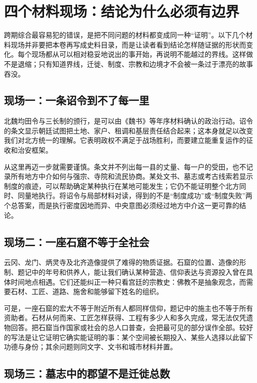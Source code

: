 \section{四个材料现场：结论为什么必须有边界}
\label{sec:synthesis-source-casefiles}

跨期综合最容易犯的错误，是把不同问题的材料都变成同一种“证明”。以下几个材料现场并非要把本卷再写成史料目录，而是让读者看到结论怎样随证据的形状而变化。每个现场都从可以相对稳妥地说出的事开始，再说明不能越过的界线。这样做不是退缩；只有知道界线，迁徙、制度、宗教和边境才不会被一条过于漂亮的故事吞没。

\subsection{现场一：一条诏令到不了每一里}

北魏均田令与三长制的颁行，是可以由《魏书》等年序材料确认的政治行动。诏令的条文显示朝廷试图把土地、家户、租调和基层责任结合起来；这本身就足以改变我们对北方统一的理解。它表明政权不满足于战场胜利，而要建立能重复运作的征收和治安框架。

从这里再迈一步就需要谨慎。条文并不列出每一县的丈量、每一户的受田，也不记录所有地方中介如何与强宗、寺院和流民协商。某处文书、墓志或考古线索若显示制度的痕迹，可以帮助确定某种执行在某地可能发生；它仍不能证明整个北方同时、同量地执行。将诏令与局部材料对读，得到的不是“制度成功”或“制度失败”两个总答案，而是执行密度因地而异、中央意图必须经过地方中介这一更可靠的结论。

\subsection{现场二：一座石窟不等于全社会}

云冈、龙门、炳灵寺及北齐造像提供了难得的物质证据。石窟的位置、造像的形制、题记中的年号和供养人，能让我们确认某种营造、信仰表达与资源投入曾在具体时间地点相遇。它们还能纠正一种只看宫廷的宗教史：佛教不是抽象观念，而需要石材、工匠、道路、施舍和能够留下姓名的组织。

可是，一座石窟的宏大不等于附近所有人都同样信仰，题记中的施主也不等于所有资助者。石材从何而来、工匠怎样获得、工程有多少人和多久完成，常无法仅凭遗物回答。把石窟当作国家或社会的总人口普查，会把最可见的部分误作全部。较好的写法是让它证明它确实能证明的事：某个空间被长期投入、某些人选择以此留下功德与身份；其余问题则同文字、文书和城市材料并置。

\subsection{现场三：墓志中的郡望不是迁徙总数}

